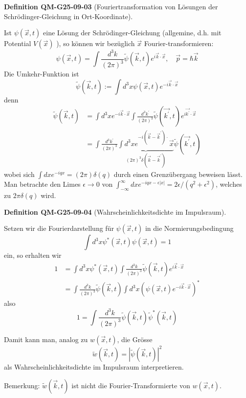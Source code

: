 \documentclass[10pt, letterpaper]{article}
\newcommand{\CustomHeading}[3]{%
  \par\medskip\noindent%
  \textbf{#1 #2} \textnormal{(#3)}.\enskip%
}
\newenvironment{DEF}[2]{\CustomHeading{Definition}{#1}{#2}}{}
\begin{document}
\begin{DEF}{QM-G25-09-03}{Fouriertransformation von Lösungen der Schrödinger-Gleichung in Ort-Koordinate}
Ist $\psi(\vec{x}, t)$ eine Lösung der Schrödinger-Gleichung (allgemine, d.h. mit Potential $V(\vec{x})$ ), so können wir bezüglich $\vec{x}$ Fourier-transformieren:
$$
\psi(\vec{x}, t)=\int \frac{d^{3} k}{(2 \pi)^{3}} \tilde{\psi}(\vec{k}, t) e^{i \vec{k} \cdot \vec{x}}, \quad \vec{p}=\hbar \vec{k}
$$
Die Umkehr-Funktion ist
$$
\tilde{\psi}(\vec{k}, t):=\int d^{3} x \psi(\vec{x}, t) e^{-i \vec{k} \cdot \vec{x}}
$$
denn
$$
\begin{aligned}
\tilde{\psi}(\vec{k}, t) & =\int d^{3} x e^{-i \vec{k} \cdot \vec{x}} \int \frac{d^{3} k^{\prime}}{(2 \pi)^{3}} \tilde{\psi}\left(\overrightarrow{k^{\prime}}, t\right) e^{i \overrightarrow{k^{\prime}} \cdot \vec{x}} \\
& =\int \frac{d^{3} k^{\prime}}{(2 \pi)^{3}} \underbrace{\int d^{3} x e^{-i\left(\vec{k}-\vec{k}^{\prime}\right) \cdot} \vec{x}}_{(2 \pi)^{3} \delta\left(\vec{k}-\vec{k}^{\prime}\right)} \tilde{\psi}\left(\overrightarrow{k^{\prime}}, t\right)
\end{aligned}
$$
wobei sich $\int d x e^{-i q x}=(2 \pi) \delta(q)$ durch einen Grenzübergang beweisen lässt. Man betrachte den Limes $\epsilon \rightarrow 0$ von $\int_{-\infty}^{\infty} d x e^{-i q x-\epsilon|x|}=2 \epsilon /\left(q^{2}+\epsilon^{2}\right)$, welches zu $2 \pi \delta(q)$ wird.
\end{DEF}

\begin{DEF}{QM-G25-09-04}{Wahrscheinlichkeitsdichte im Impulsraum}
Setzen wir die Fourierdarstellung für $\psi(\vec{x}, t)$ in die Normierungsbedingung
$$
\int d^{3} x \psi^{*}(\vec{x}, t) \psi(\vec{x}, t)=1
$$
ein, so erhalten wir
$$
\begin{aligned}
1 & =\int d^{3} x \psi^{*}(\vec{x}, t) \int \frac{d^{3} k}{(2 \pi)^{3}} \tilde{\psi}(\vec{k}, t) e^{i \vec{k} \cdot \vec{x}} \\
& =\int \frac{d^{3} k}{(2 \pi)^{3}} \tilde{\psi}(\vec{k}, t) \int d^{3} x\left(\psi(\vec{x}, t) e^{-i \vec{k} \cdot \vec{x}}\right)^{*}
\end{aligned}
$$
also
$$
1=\int \frac{d^{3} k}{(2 \pi)^{3}} \tilde{\psi}(\vec{k}, t) \tilde{\psi}^{*}(\vec{k}, t)
$$

Damit kann man, analog zu $w(\vec{x}, t)$, die Grösse
$$
\tilde{w}(\vec{k}, t)=|\tilde{\psi}(\vec{k}, t)|^{2}
$$
als Wahrscheinlichkeitsdichte im Impulsraum interpretieren.

Bemerkung: $\tilde{w}(\vec{k}, t)$ ist nicht die Fourier-Transformierte von $w(\vec{x}, t)$.
\end{DEF}
\end{document}
